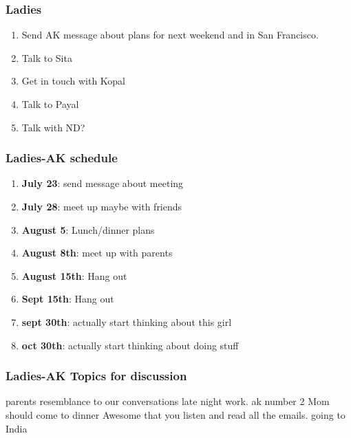 \begin{frame} 
\frametitle{Ladies}
\begin{enumerate} 
\item \small Send AK message about plans for next weekend and in San Francisco. 
\item \small Talk to Sita 
\item \small Get in touch with Kopal 
\item \small Talk to Payal
\item \small Talk with ND?
\end{enumerate} 
\end{frame} 

\begin{frame} 
\frametitle{Ladies-AK schedule}
\begin{enumerate} 
\item \textbf{July 23}: send message about meeting
\item \textbf{July 28}:  meet up maybe with friends
\item \textbf{August 5}:  Lunch/dinner plans
\item \textbf{August 8th}:  meet up with parents 
\item \textbf{August 15th}: Hang out 
\item \textbf{Sept 15th}: Hang out 
\item \textbf{sept 30th}: actually start thinking about this girl
\item \textbf{oct 30th}: actually start thinking about doing stuff
\end{enumerate} 
\end{frame}

\begin{frame} 
\frametitle{Ladies-AK Topics for discussion}
\begin{enumerate} 
\bllt parents resemblance to our conversations
\bllt late night work.
\bllt ak number 2 
\bllt Mom should come to dinner
\bllt Awesome that you listen and read all the emails. 
\bllt going to India 
\end{enumerate} 
\end{frame}
